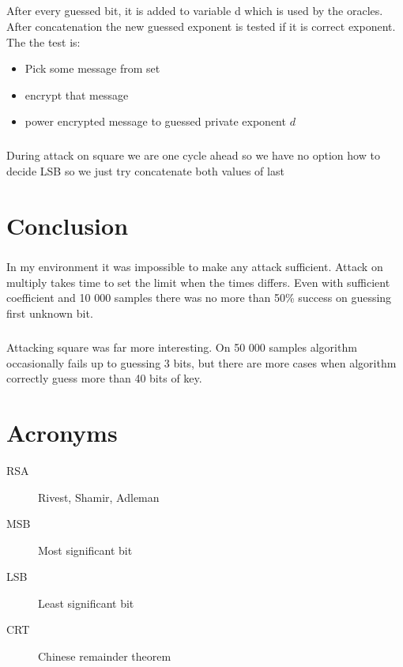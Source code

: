\documentclass[thesis=B,english]{FITthesis}[2012/10/20]
\begin{document}
{\paragraph{}{
After every guessed bit, it is added to variable d which is used by the oracles. After concatenation the new guessed exponent is tested if it is correct exponent.
The the test is:}
\begin{itemize}
 \item Pick some message from set
 \item encrypt that message
 \item power encrypted message to guessed private exponent \(d\)
\end{itemize}

\paragraph*{}{
During attack on square we are one cycle ahead so we have no option how to decide LSB so we just try concatenate both values of last  
}

\chapter{Conclusion}

\paragraph*{}{
In my environment it was impossible to make any attack sufficient. Attack on multiply takes time to set the limit when the times differs. Even with sufficient coefficient and 
10 000 samples there was no more than 50\% success on guessing first unknown bit.}

\paragraph{}{
Attacking square was far more interesting. On 50 000 samples algorithm occasionally fails up to guessing 3 bits, but there are more cases when algorithm correctly guess more than 40 bits of key.		
}





\appendix

\chapter{Acronyms}
\begin{description}
	\item[RSA] Rivest, Shamir, Adleman
	\item[MSB] Most significant bit
	\item[LSB] Least significant bit
	\item[CRT] Chinese remainder theorem
\end{description}


}
\end{document}
